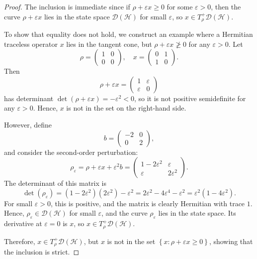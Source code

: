 \documentclass[11pt,reqno]{amsart}
\theoremstyle{definition}
\newcommand{\mc}{\mathcal}
\newcommand{\lset}{\left\{ }
\newcommand{\rset}{\right\} }
\begin{document}
\begin{proof}
    The inclusion is immediate since if $\rho + \varepsilon x \geq 0$ for some $\varepsilon > 0$, then the curve $\rho + \varepsilon x$ lies in the state space $\mc D(\mc{H})$ for small $\varepsilon$, so $x \in T^+_\rho \mc D(\mc{H})$.
    
    To show that equality does not hold, we construct an example where a Hermitian traceless operator $x$ lies in the tangent cone, but $\rho + \varepsilon x \not\geq 0$ for any $\varepsilon > 0$.
    Let
    $$\rho = \begin{pmatrix} 1 & 0 \\ 0 & 0 \end{pmatrix}, \quad
    x = \begin{pmatrix} 0 & 1 \\ 1 & 0 \end{pmatrix}.$$
    Then
    $$\rho + \varepsilon x = \begin{pmatrix} 1 & \varepsilon \\ \varepsilon & 0 \end{pmatrix}$$
    has determinant $\det(\rho + \varepsilon x) = -\varepsilon^2 < 0$, so it is not positive semidefinite for any $\varepsilon > 0$. Hence, $x$ is not in the set on the right-hand side.
    
    However, define
    $$b = \begin{pmatrix} -2 & 0 \\ 0 & 2 \end{pmatrix},$$
    and consider the second-order perturbation:
    $$\rho_\varepsilon = \rho + \varepsilon x + \varepsilon^2 b = 
    \begin{pmatrix}
    1 - 2\varepsilon^2 & \varepsilon \\
    \varepsilon & 2\varepsilon^2
    \end{pmatrix}.$$
    The determinant of this matrix is
    $$\det(\rho_\varepsilon) = (1 - 2\varepsilon^2)(2\varepsilon^2) - \varepsilon^2 = 2\varepsilon^2 - 4\varepsilon^4 - \varepsilon^2 = \varepsilon^2(1 - 4\varepsilon^2).$$
    For small $\varepsilon > 0$, this is positive, and the matrix is clearly Hermitian with trace $1$. Hence, $\rho_\varepsilon \in \mc D(\mc{H})$ for small $\varepsilon$, and the curve $\rho_\varepsilon$ lies in the state space. Its derivative at $\varepsilon = 0$ is $x$, so $x \in T^+_\rho \mc D(\mc{H})$.
    
    Therefore, $x \in T^+_\rho \mc D(\mc{H})$, but $x$ is not in the set $\lset  x : \rho + \varepsilon x \geq 0 \rset $, showing that the inclusion is strict.
\end{proof}
\end{document}
